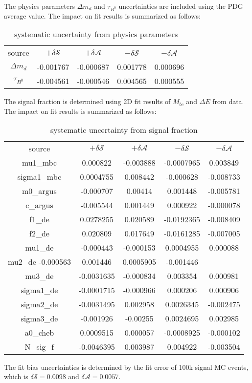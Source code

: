 The physics parameters $\Delta m_d$ and $\tau_{B^0}$ uncertainties are included using the PDG average value. The impact on fit results is summarized as follows: 
\begin{table}[H]
	\begin{minipage}[b]{1.0\linewidth}
		\centering
		\caption{systematic uncertainty from  physics parameters}
		\begin{tabular}{c c c c c}
			\hline
			source & $+\delta \mathcal{S}$ & $+\delta \mathcal{A}$ & $-\delta \mathcal{S}$ &  $-\delta \mathcal{A}$\\
		$\Delta m_d$  & -0.001767
& -0.000687
& 0.001778
& 0.000696
\\
		$\tau_{B^0}$  & -0.004561
& -0.000546
& 0.004565
& 0.000555
\\
		\hline
		\end{tabular}
	\end{minipage}
\end{table}
The signal fraction is determined using 2D fit results of $M_{bc}$ and $\Delta E$ from data. The impact on fit results is summarized as follows: 
\begin{table}[H]
	\begin{minipage}[b]{1.0\linewidth}
		\centering
		\caption{systematic uncertainty from  signal fraction}
		\begin{tabular}{c c c c c}
			\hline
			source & $+\delta \mathcal{S}$ & $+\delta \mathcal{A}$ & $-\delta \mathcal{S}$ &  $-\delta \mathcal{A}$\\
			mu1\_mbc  & 0.000822 &	-0.003888&	-0.0007965&	0.003849
\\
			sigma1\_mbc & 0.0004755&	0.008442&	-0.000628&	-0.008733
\\
			m0\_argus & -0.000707&	0.00414	&0.001448&	-0.005781
\\
			c\_argus & -0.005544&	0.001449&	0.000922&	-0.000078\\
			f1\_de & 0.0278255 &	0.020589&	-0.0192365	&-0.008409
\\
			f2\_de & 0.020809&	0.017649	&-0.0161285	&-0.007005
\\
			mu1\_de & -0.000443&	-0.000153&	0.0004955&	0.000088\\
			mu2\_de -0.000563&	0.001446&	0.0005905&	-0.001446
\\
			mu3\_de & -0.0031635&	-0.000834&	0.003354&	0.000981
\\
			sigma1\_de& -0.0001715&	-0.000966&	0.000206&	0.000906
\\
			sigma2\_de& -0.0031495&	0.002958&	0.0026345&	-0.002475
\\
			sigma3\_de& -0.001926&	-0.00255&	0.0024695&	0.002985
\\
			a0\_cheb & 0.0009515&	0.000057&	-0.0008925&	-0.000102
\\
			N\_sig\_f & -0.0046395&	0.003987&	0.004922&	-0.003504
\\
			\hline
		\end{tabular}
	\end{minipage}
\end{table}
The fit bias uncertainties is determined by the fit error of 100k signal MC events, which is $\delta {\mathcal{S}}=0.0098$ and $\delta {\mathcal{A}}=0.0057$.


